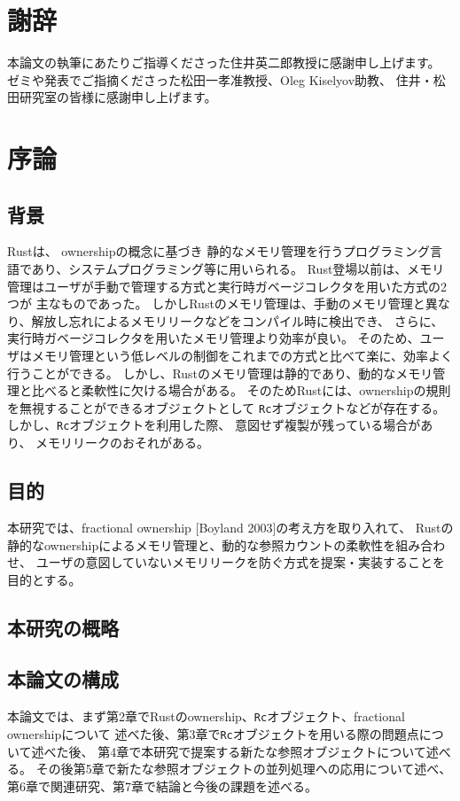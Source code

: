 \documentclass{sumiilab-paper}
\theoremstyle{mystyle}
\numberwithin{definition}{chapter} %
\begin{document}
\chapter{謝辞}
本論文の執筆にあたりご指導くださった住井英二郎教授に感謝申し上げます。
ゼミや発表でご指摘くださった松田一孝准教授、Oleg Kiselyov助教、
住井・松田研究室の皆様に感謝申し上げます。

\tableofcontents%

\mainmatter%

\chapter{序論}
\section{背景}
Rust\cite{DBLP:conf/sigada/MatsakisK14}は、
ownership\cite{DBLP:conf/oopsla/ClarkePN98}の概念に基づき
静的なメモリ管理を行うプログラミング言語であり、システムプログラミング等に用いられる。
Rust登場以前は、メモリ管理はユーザが手動で管理する方式と実行時ガベージコレクタを用いた方式の2つが
主なものであった。
しかしRustのメモリ管理は、手動のメモリ管理と異なり、解放し忘れによるメモリリークなどをコンパイル時に検出でき、
さらに、実行時ガベージコレクタを用いたメモリ管理より効率が良い。
そのため、ユーザはメモリ管理という低レベルの制御をこれまでの方式と比べて楽に、効率よく行うことができる。
しかし、Rustのメモリ管理は静的であり、動的なメモリ管理と比べると柔軟性に欠ける場合がある。
そのためRustには、ownershipの規則を無視することができるオブジェクトとして
\texttt{Rc}オブジェクトなどが存在する。
しかし、\texttt{Rc}オブジェクトを利用した際、
意図せず複製が残っている場合があり、
メモリリークのおそれがある。

\section{目的}
本研究では、fractional ownership [Boyland 2003]の考え方を取り入れて、
Rustの静的なownershipによるメモリ管理と、動的な参照カウントの柔軟性を組み合わせ、
ユーザの意図していないメモリリークを防ぐ方式を提案・実装することを目的とする。

\section{本研究の概略}

\section{本論文の構成}
本論文では、まず第2章でRustのownership、\texttt{Rc}オブジェクト、fractional ownershipについて
述べた後、第3章で\texttt{Rc}オブジェクトを用いる際の問題点について述べた後、
第4章で本研究で提案する新たな参照オブジェクトについて述べる。
その後第5章で新たな参照オブジェクトの並列処理への応用について述べ、
第6章で関連研究、第7章で結論と今後の課題を述べる。
\end{document}
